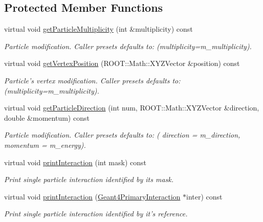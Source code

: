 \subsection*{Protected Member Functions}
\begin{DoxyCompactItemize}
\item 
virtual void \hyperlink{class_d_d4hep_1_1_simulation_1_1_geant4_particle_generator_a11e2509ffa4cbdb3abceaf71706d7093}{getParticleMultiplicity} (int \&multiplicity) const 
\begin{DoxyCompactList}\small\item\em Particle modification. Caller presets defaults to: (multiplicity=m\_\-multiplicity). \item\end{DoxyCompactList}\item 
virtual void \hyperlink{class_d_d4hep_1_1_simulation_1_1_geant4_particle_generator_a45b2aea5eeb5e76e14b01f297198dcd6}{getVertexPosition} (ROOT::Math::XYZVector \&position) const 
\begin{DoxyCompactList}\small\item\em Particle's vertex modification. Caller presets defaults to: (multiplicity=m\_\-multiplicity). \item\end{DoxyCompactList}\item 
virtual void \hyperlink{class_d_d4hep_1_1_simulation_1_1_geant4_particle_generator_ac1bc512eb2de940c32c177a2c342d129}{getParticleDirection} (int num, ROOT::Math::XYZVector \&direction, double \&momentum) const 
\begin{DoxyCompactList}\small\item\em Particle modification. Caller presets defaults to: ( direction = m\_\-direction, momentum = m\_\-energy). \item\end{DoxyCompactList}\item 
virtual void \hyperlink{class_d_d4hep_1_1_simulation_1_1_geant4_particle_generator_abc90654fbbdfdb5ecf04726d7db97197}{printInteraction} (int mask) const 
\begin{DoxyCompactList}\small\item\em Print single particle interaction identified by its mask. \item\end{DoxyCompactList}\item 
virtual void \hyperlink{class_d_d4hep_1_1_simulation_1_1_geant4_particle_generator_a7102042cb54dda778799821f35a3594e}{printInteraction} (\hyperlink{class_d_d4hep_1_1_simulation_1_1_geant4_primary_interaction}{Geant4PrimaryInteraction} $\ast$inter) const 
\begin{DoxyCompactList}\small\item\em Print single particle interaction identified by it's reference. \item\end{DoxyCompactList}\end{DoxyCompactItemize}
